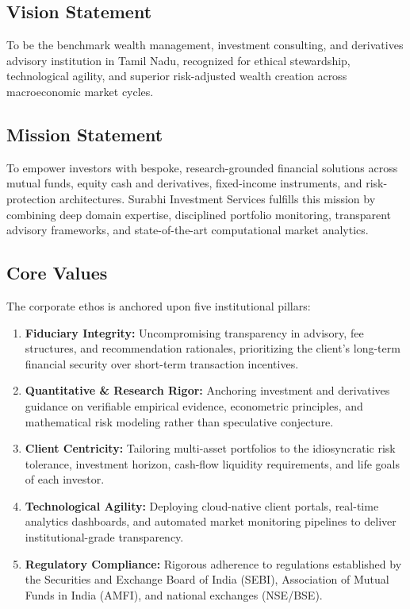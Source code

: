 \subsection{Vision Statement}
To be the benchmark wealth management, investment consulting, and derivatives advisory institution in Tamil Nadu, recognized for ethical stewardship, technological agility, and superior risk-adjusted wealth creation across macroeconomic market cycles.

\subsection{Mission Statement}
To empower investors with bespoke, research-grounded financial solutions across mutual funds, equity cash and derivatives, fixed-income instruments, and risk-protection architectures. Surabhi Investment Services fulfills this mission by combining deep domain expertise, disciplined portfolio monitoring, transparent advisory frameworks, and state-of-the-art computational market analytics.

\subsection{Core Values}
The corporate ethos is anchored upon five institutional pillars:
\begin{enumerate}\setlength{\itemsep}{0pt}\setlength{\parskip}{0pt}
    \item \textbf{Fiduciary Integrity:} Uncompromising transparency in advisory, fee structures, and recommendation rationales, prioritizing the client's long-term financial security over short-term transaction incentives.
    \item \textbf{Quantitative \& Research Rigor:} Anchoring investment and derivatives guidance on verifiable empirical evidence, econometric principles, and mathematical risk modeling rather than speculative conjecture.
    \item \textbf{Client Centricity:} Tailoring multi-asset portfolios to the idiosyncratic risk tolerance, investment horizon, cash-flow liquidity requirements, and life goals of each investor.
    \item \textbf{Technological Agility:} Deploying cloud-native client portals, real-time analytics dashboards, and automated market monitoring pipelines to deliver institutional-grade transparency.
    \item \textbf{Regulatory Compliance:} Rigorous adherence to regulations established by the Securities and Exchange Board of India (SEBI), Association of Mutual Funds in India (AMFI), and national exchanges (NSE/BSE).
\end{enumerate}

